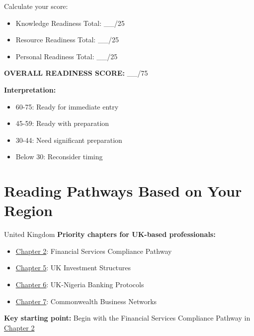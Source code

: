 \begin{workshopbox}
Calculate your score:
\begin{itemize}
    \item Knowledge Readiness Total: \_\_/25
    \item Resource Readiness Total: \_\_/25
    \item Personal Readiness Total: \_\_/25
\end{itemize}

\textbf{OVERALL READINESS SCORE:} \_\_/75

\textbf{Interpretation:}
\begin{itemize}
    \item 60-75: Ready for immediate entry
    \item 45-59: Ready with preparation
    \item 30-44: Need significant preparation
    \item Below 30: Reconsider timing
\end{itemize}
\end{workshopbox}

\section{Reading Pathways Based on Your Region}\label{sec:reading-pathways}

\begin{regionalbox}{United Kingdom}
\textbf{Priority chapters for UK-based professionals:}
\begin{itemize}
    \item \hyperref[ch:building-your-entry-strategy]{Chapter 2}: Financial Services Compliance Pathway
    \item \hyperref[ch:financial-planning]{Chapter 5}: UK Investment Structures
    \item \hyperref[ch:risk-management-and-compliance]{Chapter 6}: UK-Nigeria Banking Protocols
    \item \hyperref[ch:local-network]{Chapter 7}: Commonwealth Business Networks
\end{itemize}

\textbf{Key starting point:} Begin with the Financial Services Compliance Pathway in \hyperref[ch:building-your-entry-strategy]{Chapter 2}
\end{regionalbox}

